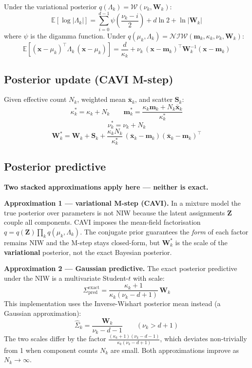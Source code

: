 \documentclass[12pt, a4paper]{article}
\newcommand{\E}{\mathbb{E}}
\newcommand{\1}{\mathbf{1}}
\newcommand{\cW}{\mathcal{W}}
\newcommand{\cNIW}{\mathcal{NIW}}
\begin{document}
Under the variational posterior $q(\Lambda_k) = \cW(\nu_k, \mathbf{W}_k)$:
\[
\E\!\left[\log|\Lambda_k|\right]
= \sum_{i=0}^{d-1} \psi\!\left(\frac{\nu_k - i}{2}\right)
  + d\ln 2 + \ln|\mathbf{W}_k|
\]
where $\psi$ is the digamma function.  Under
$q(\mu_k, \Lambda_k) = \cNIW(\mathbf{m}_k, \kappa_k, \nu_k, \mathbf{W}_k)$:
\[
\E\!\left[(\mathbf{x} - \mu_k)^\top \Lambda_k\,(\mathbf{x} - \mu_k)\right]
= \frac{d}{\kappa_k}
  + \nu_k\,(\mathbf{x} - \mathbf{m}_k)^\top
    \mathbf{W}_k^{-1}(\mathbf{x} - \mathbf{m}_k)
\]

\subsection{Posterior update (CAVI M-step)}

Given effective count $N_k$, weighted mean $\bar{\mathbf{x}}_k$, and scatter
$\mathbf{S}_k$:
\[
\kappa_k^* = \kappa_k + N_k
\qquad
\mathbf{m}_k^* = \frac{\kappa_k \mathbf{m}_k + N_k \bar{\mathbf{x}}_k}{\kappa_k^*}
\]
\[
\nu_k^* = \nu_k + N_k
\]
\[
\mathbf{W}_k^* = \mathbf{W}_k + \mathbf{S}_k
+ \frac{\kappa_k N_k}{\kappa_k^*}\,
  (\bar{\mathbf{x}}_k - \mathbf{m}_k)(\bar{\mathbf{x}}_k - \mathbf{m}_k)^\top
\]

\subsection{Posterior predictive}

\textbf{Two stacked approximations apply here --- neither is exact.}

\textbf{Approximation 1 --- variational M-step (CAVI).}  In a mixture model the
true posterior over parameters is not NIW because the latent assignments
$\mathbf{Z}$ couple all components.  CAVI imposes the mean-field factorisation
$q = q(\mathbf{Z})\prod_k q(\mu_k,\Lambda_k)$.  The conjugate prior guarantees
the \textit{form} of each factor remains NIW and the M-step stays closed-form, but
$\mathbf{W}_k^*$ is the scale of the \textbf{variational} posterior, not the exact
Bayesian posterior.

\textbf{Approximation 2 --- Gaussian predictive.}  The exact posterior predictive
under the NIW is a multivariate Student-$t$ with scale:
\[
\Sigma_\text{pred}^{\text{exact}}
= \frac{\kappa_k+1}{\kappa_k(\nu_k - d + 1)}\,\mathbf{W}_k
\]
This implementation uses the Inverse-Wishart posterior mean instead (a Gaussian
approximation):
\[
\hat{\Sigma}_k = \frac{\mathbf{W}_k}{\nu_k - d - 1} \qquad (\nu_k > d+1)
\]
The two scales differ by the factor
$\frac{(\kappa_k+1)(\nu_k-d-1)}{\kappa_k(\nu_k-d+1)}$, which deviates
non-trivially from 1 when component counts $N_k$ are small.  Both approximations
improve as $N_k \to \infty$.
\end{document}
